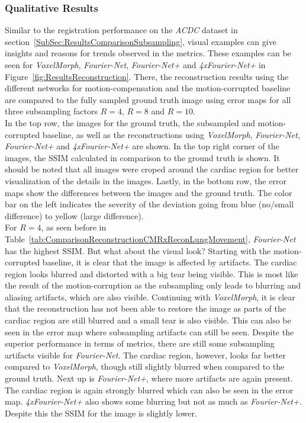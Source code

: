 \subsubsection{Qualitative Results}
Similar to the registration performance on the \emph{ACDC} dataset in section~\ref{SubSec:ResultsComparisonSubsampling}, visual examples can give insights and reasons for trends observed in the metrics. These examples can be seen for \emph{VoxelMorph}, \emph{Fourier-Net}, \emph{Fourier-Net+} and \emph{4xFourier-Net+} in Figure~\ref{fig:ResultsReconstruction}. There, the reconstruction results using the different networks for motion-compensation and the motion-corrupted baseline are compared to the fully sampled ground truth image using error maps for all three subsampling factors $R=4$, $R=8$ and $R=10$.\\
In the top row, the images for the ground truth, the subsampled and motion-corrupted baseline, as well as the reconstructions using \emph{VoxelMorph}, \emph{Fourier-Net}, \emph{Fourier-Net+} and \emph{4xFourier-Net+} are shown. In the top right corner of the images, the SSIM calculated in comparison to the ground truth is shown. It should be noted that all images were croped around the cardiac region for better visualization of the details in the images. Lastly, in the bottom row, the error maps show the differences between the images and the ground truth. The color bar on the left indicates the severity of the deviation going from blue (no/small difference) to yellow (large difference).\\
For $R=4$, as seen before in Table~\ref{tab:ComparisonReconstructionCMRxReconLungMovement}, \emph{Fourier-Net} has the highest SSIM. But what about the visual look? Starting with the motion-corrupted baseline, it is clear that the image is affected by artifacts. The cardiac region looks blurred and distorted with a big tear being visible. This is most like the result of the motion-corruption as the subsampling only leads to blurring and aliasing artifacts, which are also visible. Continuing with \emph{VoxelMorph}, it is clear that the reconstruction has not been able to restore the image as parts of the cardiac region are still blurred and a small tear is also visible. This can also be seen in the error map where subsampling artifacts can still be seen. Despite the superior performance in terms of metrics, there are still some subsampling artifacts visible for \emph{Fourier-Net}. The cardiac region, however, looks far better compared to \emph{VoxelMorph}, though still slightly blurred when compared to the ground truth. Next up is \emph{Fourier-Net+}, where more artifacts are again present. The cardiac region is again strongly blurred which can also be seen in the error map. \emph{4xFourier-Net+} also shows some blurring but not as much as \emph{Fourier-Net+}. Despite this the SSIM for the image is slightly lower.\\
